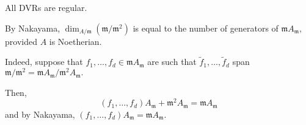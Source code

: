 \begin{example}
  All DVRs are regular.
\end{example}

\begin{note}
  By Nakayama, \(\dim_{A/{\mathfrak m}}(\mathfrak m/{\mathfrak m^2})\) is equal to the number of generators of \(\mathfrak m A_{\mathfrak m},\) provided \(A\) is Noetherian.

  Indeed, suppose that \(f_1, \dotsc, f_d \in \mathfrak m A_{\mathfrak m}\) are such that \(\tilde{f}_1, \dotsc, \tilde{f}_d\) span \(\mathfrak m /{\mathfrak m^2} = \mathfrak m A_{\mathfrak m}/{\mathfrak m^2 A_{\mathfrak m}}.\)

  Then,
  \[(f_1, \dotsc, f_d) A_{\mathfrak m} + \mathfrak m^2 A_{\mathfrak m} = \mathfrak m A_{\mathfrak m}\]
  and by Nakayama, \((f_1, \dotsc, f_d) A_{\mathfrak m} = \mathfrak m A_{\mathfrak m}.\)
\end{note}






